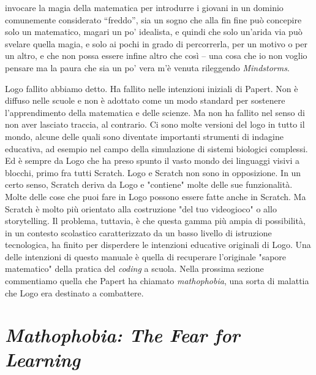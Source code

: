 invocare la magia della matematica per introdurre i giovani in un dominio comunemente considerato “freddo”, sia un sogno che alla fin fine può concepire solo un matematico, magari un po' idealista, e quindi che solo un'arida via può svelare quella magia, e solo ai pochi in grado di percorrerla, per un motivo o per un altro, e che non possa essere infine altro che così – una cosa che io non voglio pensare ma la paura che sia un po' vera m'è venuta rileggendo \textit{Mindstorms}.

Logo fallito abbiamo detto. Ha fallito nelle intenzioni iniziali di Papert. Non è diffuso nelle scuole e non è adottato come un modo standard per sostenere l'apprendimento della matematica e delle scienze. Ma non ha fallito nel senso di non aver lasciato traccia, al contrario. Ci sono molte versioni del logo in tutto il mondo, alcune delle quali sono diventate importanti strumenti di indagine educativa, ad esempio nel campo della simulazione di sistemi biologici complessi. Ed è sempre da Logo che ha preso spunto il vasto mondo dei linguaggi visivi a blocchi, primo fra tutti Scratch. Logo e Scratch non sono in opposizione. In un certo senso, Scratch deriva da Logo e "contiene" molte delle sue funzionalità. Molte delle cose che puoi fare in Logo possono essere fatte anche in Scratch. Ma Scratch è molto più orientato alla costruzione "del tuo videogioco" o allo storytelling. Il problema, tuttavia, è che questa gamma più ampia di possibilità, in un contesto scolastico caratterizzato da un basso livello di istruzione tecnologica, ha finito per disperdere le intenzioni educative originali di Logo. Una delle intenzioni di questo manuale è quella di recuperare l'originale "sapore matematico" della pratica del \textit{coding} a scuola. Nella prossima sezione commentiamo quella che Papert ha chiamato \textit{mathophobia}, una sorta di malattia che Logo era destinato a combattere. 

\section{\textit{\textit{Mathophobia}: The Fear for Learning}}


